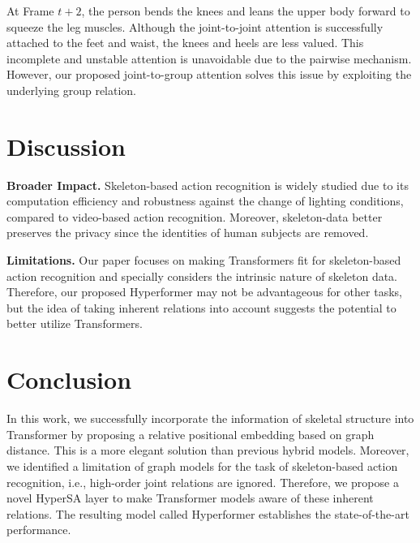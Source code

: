\documentclass[10pt,twocolumn,letterpaper]{article}
\begin{document}
At Frame $t+2$, the person bends the knees and leans the upper body forward to squeeze the leg muscles. Although the joint-to-joint attention is successfully attached to the feet and waist, the knees and heels are less valued. This incomplete and unstable attention is unavoidable due to the pairwise mechanism. However, our proposed joint-to-group attention solves this issue by exploiting the underlying group relation.  

\section{Discussion}
\noindent\textbf{Broader Impact. }
Skeleton-based action recognition is widely studied due to its computation efficiency and robustness against the change of lighting conditions, compared to video-based action recognition. Moreover, skeleton-data better preserves the privacy since the identities of human subjects are removed. %

\noindent\textbf{Limitations.}
\label{limit}
Our paper focuses on making Transformers fit for skeleton-based action recognition and specially considers the intrinsic nature of skeleton data. Therefore, our proposed Hyperformer may not be advantageous for other tasks, but the idea of taking inherent relations into account suggests the potential to better utilize Transformers. 
\section{Conclusion}

In this work, we successfully incorporate the information of skeletal structure into Transformer by proposing a relative positional embedding based on graph distance. This is a more elegant solution than previous hybrid models. Moreover, we identified a limitation of graph models for the task of skeleton-based action recognition, i.e., high-order joint relations are ignored.
Therefore, we propose a novel HyperSA layer to make Transformer models aware of these inherent relations. 
The resulting model called Hyperformer establishes the state-of-the-art performance.

\clearpage

{\small


}
\end{document}
